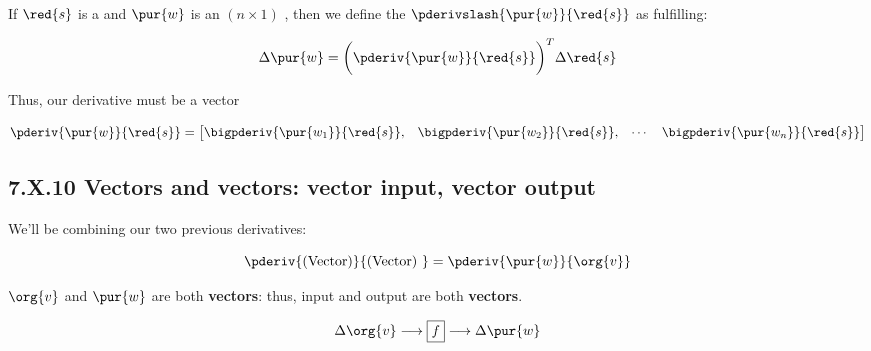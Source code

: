         \begin{definition}
            If $\red{s}$ is a  and $\pur{w}$ is an $(n \times 1)$ , then we define the  $\pderivslash{ \pur{w} }{ \red{s} }$ as fulfilling:
            
            \begin{equation*}
                \Delta \pur{w}
                =
                \bigg(
                    \pderiv{ \pur{w} }{ \red{s} } 
                \bigg)^T
                \Delta \red{s}
            \end{equation*}
            
            Thus, our derivative must be a  vector
            
            \begin{equation*}
                \pderiv{ \pur{w} }{ \red{s} } 
                =
                \begin{bmatrix}
                    \bigpderiv{ \pur{w_1} }{ \red{s} }, &
                    \bigpderiv{ \pur{w_2} }{ \red{s} }, &
                    \cdots &
                    \bigpderiv{ \pur{w_n} }{ \red{s} } 
                \end{bmatrix}
            \end{equation*}
        \end{definition}
    
    \secdiv
    
    \subsection*{7.X.10 \quad Vectors and vectors: vector input, vector output}  
    
        We'll be combining our two previous derivatives: 
        
        \begin{equation}
            \pderiv{ \text{(Vector)} } { \text{(Vector) } }
            =
            \pderiv{ \pur{w} }{ \org{v} } 
        \end{equation}
        
        $\org{v}$ and $\pur{w}$ are both \textbf{vectors}: thus, input and output are both \textbf{vectors}.
        
        \begin{equation}
            \Delta \org{v}
            \longrightarrow
            \boxed{f}
            \longrightarrow
            \Delta \pur{w}
        \end{equation}
        
